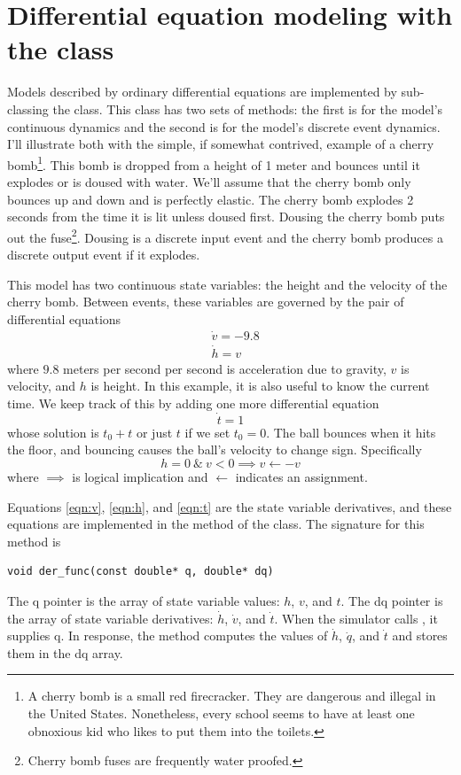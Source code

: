 \section{Differential equation modeling with the  class}
Models described by ordinary differential equations are implemented by sub-classing the  class. This class has two sets of methods: the first is for the model's continuous dynamics and the second is for the model's discrete event dynamics. I'll illustrate both with the simple, if somewhat contrived, example of a cherry bomb\footnote{A cherry bomb is a small red firecracker. They are dangerous and illegal in the United States. Nonetheless, every school seems to have at least one obnoxious kid who likes to put them into the toilets.}. This bomb is dropped from a height of 1 meter and bounces until it explodes or is doused with water. We'll assume that the cherry bomb only bounces up and down and is perfectly elastic. The cherry bomb explodes 2 seconds from the time it is lit unless doused first. Dousing the cherry bomb puts out the fuse\footnote{Cherry bomb fuses are frequently water proofed.}. Dousing is a discrete input event and the cherry bomb produces a discrete output event if it explodes. 

This model has two continuous state variables: the height and the velocity of the cherry bomb. Between events, these variables are governed by the pair of differential equations
\begin{align}
&\dot{v} = -9.8 \label{eqn:v} \\
&\dot{h} = v \label{eqn:h}
\end{align}
where $9.8$ meters per second per second is acceleration due to gravity, $v$ is velocity, and $h$ is height. In this example, it is also useful to know the current time. We keep track of this by adding one more differential equation
\begin{equation}
\dot{t} = 1 \label{eqn:t}
\end{equation}
whose solution is $t_0 + t$ or just $t$ if we set $t_0 = 0$. The ball bounces when it hits the floor, and bouncing causes the ball's velocity to change sign. Specifically
\begin{equation}
h = 0 \ \& \ v < 0 \implies v \leftarrow -v \label{eqn:state_event}
\end{equation}
where $\implies$ is logical implication and $\leftarrow$ indicates an assignment. 

Equations \ref{eqn:v}, \ref{eqn:h}, and \ref{eqn:t} are the state variable derivatives, and these equations are implemented in the  method of the  class. The signature for this method is
\begin{verbatim}
void der_func(const double* q, double* dq)
\end{verbatim}
The q pointer is the array of state variable values: $h$, $v$, and $t$. The dq pointer is the array of state variable derivatives: $\dot{h}$, $\dot{v}$, and $\dot{t}$. When the simulator calls , it supplies q. In response, the method computes the values of $\dot{h}$, $\dot{q}$, and $\dot{t}$ and stores them in the dq array.

